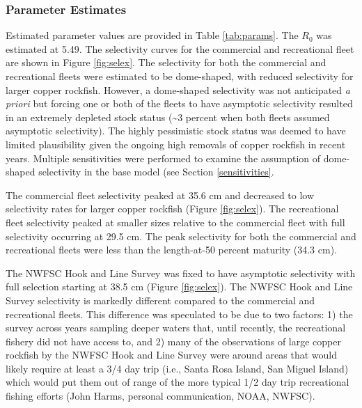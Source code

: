 \documentclass[11pt,
  english,
  a4paper,
]{article}
\begin{document}
\leavevmode\tagmcend\tagstructend\par


\hypertarget{parameter-estimates}{%
\subsubsection{Parameter Estimates}\label{parameter-estimates}}

\leavevmode\tagmcend\tagstructend


Estimated parameter values are provided in Table \ref{tab:params}. The {\(R_0\)\leavevmode\tagmcend\tagstructend} was estimated at 5.49. The selectivity curves for the commercial and recreational fleet are shown in Figure \ref{fig:selex}. The selectivity for both the commercial and recreational fleets were estimated to be dome-shaped, with reduced selectivity for larger copper rockfish. However, a dome-shaped selectivity was not anticipated \emph{a priori} but forcing one or both of the fleets to have asymptotic selectivity resulted in an extremely depleted stock status (\textasciitilde3 percent when both fleets assumed asymptotic selectivity). The highly pessimistic stock status was deemed to have limited plausibility given the ongoing high removals of copper rockfish in recent years. Multiple sensitivities were performed to examine the assumption of dome-shaped selectivity in the base model (see Section \ref{sensitivities}.

\leavevmode\tagmcend\tagstructend\par


The commercial fleet selectivity peaked at 35.6 cm and decreased to low selectivity rates for larger copper rockfish (Figure \ref{fig:selex}). The recreational fleet selectivity peaked at smaller sizes relative to the commercial fleet with full selectivity occurring at 29.5 cm. The peak selectivity for both the commercial and recreational fleets were less than the length-at-50 percent maturity (34.3 cm).

\leavevmode\tagmcend\tagstructend\par


The NWFSC Hook and Line Survey was fixed to have asymptotic selectivity with full selection starting at 38.5 cm (Figure \ref{fig:selex}). The NWFSC Hook and Line Survey selectivity is markedly different compared to the commercial and recreational fleets. This difference was speculated to be due to two factors: 1) the survey across years sampling deeper waters that, until recently, the recreational fishery did not have access to, and 2) many of the observations of large copper rockfish by the NWFSC Hook and Line Survey were around areas that would likely require at least a 3/4 day trip (i.e., Santa Rosa Island, San Miguel Island) which would put them out of range of the more typical 1/2 day trip recreational fishing efforts (John Harms, personal communication, NOAA, NWFSC).
\end{document}
